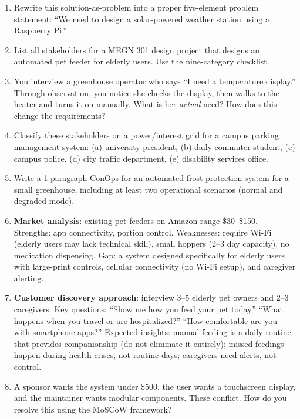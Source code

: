 \begin{enumerate}[leftmargin=1.5em]
\item Rewrite this solution-as-problem into a proper five-element problem statement: ``We need to design a solar-powered weather station using a Raspberry Pi.''
\item List all stakeholders for a MEGN 301 design project that designs an automated pet feeder for elderly users. Use the nine-category checklist.
\item You interview a greenhouse operator who says ``I need a temperature display.'' Through observation, you notice she checks the display, then walks to the heater and turns it on manually. What is her \emph{actual} need? How does this change the requirements?
\item Classify these stakeholders on a power/interest grid for a campus parking management system: (a) university president, (b) daily commuter student, (c) campus police, (d) city traffic department, (e) disability services office.
\item Write a 1-paragraph ConOps for an automated frost protection system for a small greenhouse, including at least two operational scenarios (normal and degraded mode).

\item \textbf{Market analysis}: existing pet feeders on Amazon range \$30--\$150. Strengths: app connectivity, portion control. Weaknesses: require Wi-Fi (elderly users may lack technical skill), small hoppers (2--3 day capacity), no medication dispensing. Gap: a system designed specifically for elderly users with large-print controls, cellular connectivity (no Wi-Fi setup), and caregiver alerting.

\item \textbf{Customer discovery approach}: interview 3--5 elderly pet owners and 2--3 caregivers. Key questions: ``Show me how you feed your pet today.'' ``What happens when you travel or are hospitalized?'' ``How comfortable are you with smartphone apps?'' Expected insights: manual feeding is a daily routine that provides companionship (do not eliminate it entirely); missed feedings happen during health crises, not routine days; caregivers need alerts, not control.

\item A sponsor wants the system under \$500, the user wants a touchscreen display, and the maintainer wants modular components. These conflict. How do you resolve this using the MoSCoW framework?
\end{enumerate}

